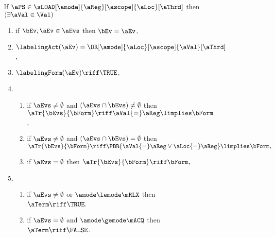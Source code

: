 \begin{figure}
  \noindent
  If $\aPS \in \sLOAD[\amode]{\aReg}[\ascope]{\aLoc}[\aThrd]$ then
  $(\exists\aVal\in\Val)$
  \begin{multicols}{2}
    \begin{enumerate}[topsep=0pt,label=(\textsc{r}\arabic*),ref=\textsc{r}\arabic*]
    \item \label{read-E}
      if $\bEv,\aEv\in\aEvs$ then $\bEv=\aEv$,
    \item \label{read-lambda}
      $\labelingAct(\aEv) = \DR[\amode]{\aLoc}[\ascope]{\aVal}[\aThrd]$,
    \item \label{read-kappa}
      $\labelingForm(\aEv) \riff \TRUE$,
    \item[] 
      \begin{enumerate}[leftmargin=0pt]
      \item \label{read-tau-dep}
        if $\aEvs\neq\emptyset$ and $(\aEvs\cap\bEvs)\neq\emptyset$ then
        \begin{math}
          \aTr{\bEvs}{\bForm} \riff
          \aVal{=}\aReg
          \limplies \bForm
        \end{math},    
      \item \label{read-tau-ind}
        if $\aEvs\neq\emptyset$ and $(\aEvs\cap\bEvs)=\emptyset$ then
        \begin{math}
          \aTr{\bEvs}{\bForm} \riff
          \PBR{\aVal{=}\aReg \lor \aLoc{=}\aReg} \limplies
          \bForm,
        \end{math}
      \item \label{read-tau-empty}
        if $\aEvs=\emptyset$ then
        \begin{math}
          \aTr{\bEvs}{\bForm} \riff
          \bForm,
        \end{math}
      \end{enumerate}
    \item[] 
      \begin{enumerate}[leftmargin=0pt]
      \item \label{read-term-nonempty}
        if $\aEvs\neq\emptyset$ or $\amode\lemode\mRLX$ then $\aTerm \riff \TRUE$. 
      \item \label{read-term-empty}
        if $\aEvs=\emptyset$ and $\amode\gemode\mACQ$ then $\aTerm \riff \FALSE$. 
      \end{enumerate}      
    \end{enumerate}
  \end{multicols}
  \medskip


\end{figure}
